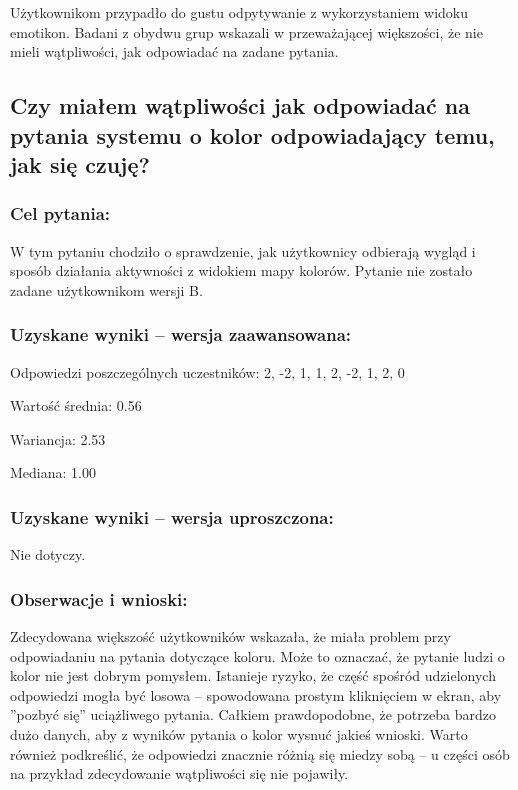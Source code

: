 	Użytkownikom przypadło do gustu odpytywanie z wykorzystaniem widoku emotikon. Badani z obydwu grup wskazali w przeważającej większości, że nie mieli wątpliwości, jak odpowiadać na zadane pytania.
	
	
	\subsection{Czy miałem wątpliwości jak odpowiadać na pytania systemu o kolor odpowiadający temu, jak się czuję?}
	
	\subsubsection{Cel pytania:}
	
	W tym pytaniu chodziło o sprawdzenie, jak użytkownicy odbierają wygląd i sposób działania aktywności z widokiem mapy kolorów. Pytanie nie zostało zadane użytkownikom wersji B.
	
	\subsubsection{Uzyskane wyniki -- wersja zaawansowana:}
	
	Odpowiedzi poszczególnych uczestników: 2, -2, 1, 1, 2, -2, 1, 2, 0
	
	Wartość średnia: 0.56
	
	Wariancja: 2.53
	
	Mediana: 1.00
	
	\subsubsection{Uzyskane wyniki -- wersja uproszczona:}
	
	Nie dotyczy.
	
	\subsubsection{Obserwacje i wnioski:}
	
	Zdecydowana większość użytkowników wskazała, że miała problem przy odpowiadaniu na pytania dotyczące koloru. Może to oznaczać, że pytanie ludzi o kolor nie jest dobrym pomysłem. Istanieje ryzyko, że część spośród udzielonych odpowiedzi mogła być losowa -- spowodowana prostym kliknięciem w ekran, aby ''pozbyć się'' uciążliwego pytania. Całkiem prawdopodobne, że potrzeba bardzo dużo danych, aby z wyników pytania o kolor wysnuć jakieś wnioski. Warto również podkreślić, że odpowiedzi znacznie różnią się miedzy sobą -- u części osób na przykład zdecydowanie wątpliwości się nie pojawiły.



